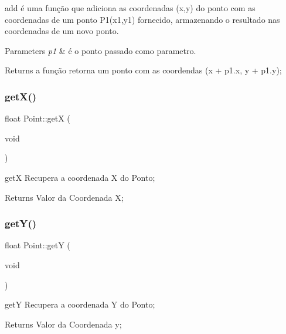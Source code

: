 add é uma função que adiciona as coordenadas (x,y) do ponto com as coordenadas de um ponto P1(x1,y1) fornecido, armazenando o resultado nas coordenadas de um novo ponto. 


\begin{DoxyParams}{Parameters}
{\em p1} & é o ponto passado como parametro. \\
\hline
\end{DoxyParams}
\begin{DoxyReturn}{Returns}
a função retorna um ponto com as coordendas (x + p1.\+x, y + p1.\+y); 
\end{DoxyReturn}
\mbox{\label{class_point_a9aa94b8fd07296e64d304ef3750db113}} 
\subsubsection{\texorpdfstring{get\+X()}{getX()}}
{\footnotesize\ttfamily float Point\+::getX (\begin{DoxyParamCaption}\item[{void}]{ }\end{DoxyParamCaption})}



getX Recupera a coordenada X do Ponto; 

\begin{DoxyReturn}{Returns}
Valor da Coordenada X; 
\end{DoxyReturn}
\mbox{\label{class_point_a2444daa96871c89614510bc4bfcd19ce}} 
\subsubsection{\texorpdfstring{get\+Y()}{getY()}}
{\footnotesize\ttfamily float Point\+::getY (\begin{DoxyParamCaption}\item[{void}]{ }\end{DoxyParamCaption})}



getY Recupera a coordenada Y do Ponto; 

\begin{DoxyReturn}{Returns}
Valor da Coordenada y; 
\end{DoxyReturn}
\mbox{\label{class_point_a7c50a40a930fb7f3adc0f8e7b60b7d79}} 
